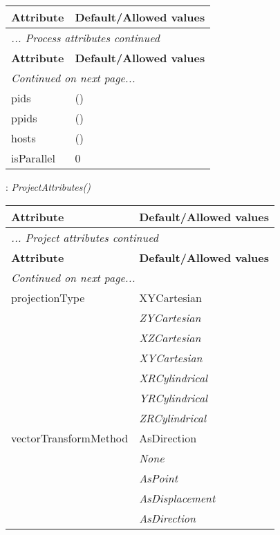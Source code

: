 \documentclass[10pt,a4paper]{report}
\begin{document}
\begin{longtable}{ll}
{\bf Attribute} & {\bf Default/Allowed values} \\
\hline \hline
\endfirsthead
\multicolumn{2}{l}{{\it ... Process attributes continued}} \\
{\bf Attribute} & {\bf Default/Allowed values} \\
\hline \hline
\endhead
\hline
\multicolumn{2}{l}{{\it Continued on next page...}} \\
\endfoot
\hline
\endlastfoot

pids  &  () \\
ppids  &  () \\
hosts  &  () \\
isParallel  &  0 \\
\end{longtable}

\newpage

{}
: {\it ProjectAttributes() }\\[-3mm]

\begin{longtable}{ll}
{\bf Attribute} & {\bf Default/Allowed values} \\
\hline \hline
\endfirsthead
\multicolumn{2}{l}{{\it ... Project attributes continued}} \\
{\bf Attribute} & {\bf Default/Allowed values} \\
\hline \hline
\endhead
\hline
\multicolumn{2}{l}{{\it Continued on next page...}} \\
\endfoot
\hline
\endlastfoot

projectionType  &  XYCartesian   \\
 & {\it  ZYCartesian} \\
 & {\it  XZCartesian} \\
 & {\it  XYCartesian} \\
 & {\it  XRCylindrical} \\
 & {\it  YRCylindrical} \\
 & {\it  ZRCylindrical} \\
vectorTransformMethod  &  AsDirection   \\
 & {\it  None} \\
 & {\it  AsPoint} \\
 & {\it  AsDisplacement} \\
 & {\it  AsDirection} \\
\end{longtable}
\end{document}
